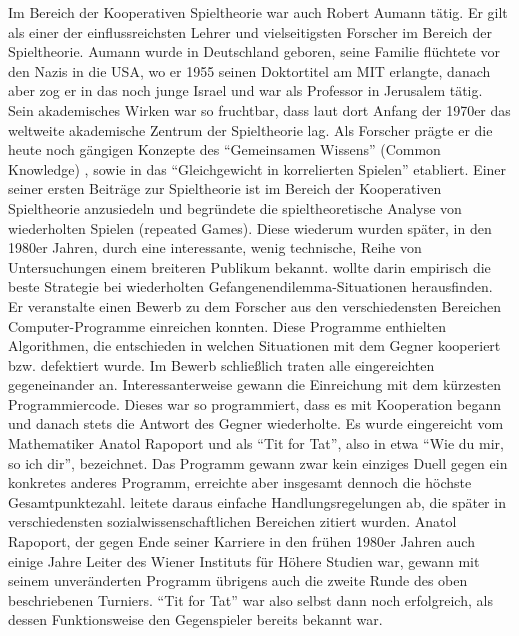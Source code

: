 Im Bereich der Kooperativen Spieltheorie war auch Robert Aumann tätig. Er gilt als einer der einflussreichsten Lehrer und vielseitigsten Forscher im Bereich der Spieltheorie. Aumann wurde in Deutschland geboren, seine Familie flüchtete vor den Nazis in die USA, wo er 1955 seinen Doktortitel am MIT erlangte, danach aber zog er in das noch junge Israel und war als Professor in Jerusalem tätig. Sein akademisches Wirken war so fruchtbar, dass laut \textcite[S. 120]{Roth2019} dort Anfang der 1970er das weltweite akademische Zentrum der Spieltheorie lag. Als Forscher prägte er die heute noch gängigen Konzepte des "`Gemeinsamen Wissens"' (Common Knowledge) \parencite{Aumann1976}, sowie in \textcite{Aumann1987} das "`Gleichgewicht in korrelierten Spielen"' etabliert. Einer seiner ersten Beiträge zur Spieltheorie \parencite{Aumann1959} ist im Bereich der Kooperativen Spieltheorie anzusiedeln und begründete die spieltheoretische Analyse von wiederholten Spielen (repeated Games). Diese wiederum wurden später, in den 1980er Jahren, durch eine interessante, wenig technische, Reihe von Untersuchungen einem breiteren Publikum bekannt. \textcite{Axelrod1981, Axelrod1984} wollte darin empirisch die beste Strategie bei wiederholten Gefangenendilemma-Situationen herausfinden. Er veranstalte einen Bewerb zu dem Forscher aus den verschiedensten Bereichen Computer-Programme einreichen konnten. Diese Programme enthielten Algorithmen, die entschieden in welchen Situationen mit dem Gegner kooperiert bzw. defektiert wurde. Im Bewerb schließlich traten alle eingereichten gegeneinander an. Interessanterweise gewann die Einreichung mit dem kürzesten Programmiercode. Dieses war so programmiert, dass es mit Kooperation begann und danach stets die Antwort des Gegner wiederholte. Es wurde eingereicht vom Mathematiker Anatol Rapoport und als "`Tit for Tat"', also in etwa "`Wie du mir, so ich dir"', bezeichnet. Das Programm gewann zwar kein einziges Duell gegen ein konkretes anderes Programm, erreichte aber insgesamt dennoch die höchste Gesamtpunktezahl. \textcite{Axelrod1984} leitete daraus einfache Handlungsregelungen ab, die später in verschiedensten sozialwissenschaftlichen Bereichen zitiert wurden. Anatol Rapoport, der gegen Ende seiner Karriere in den frühen 1980er Jahren auch einige Jahre Leiter des Wiener Instituts für Höhere Studien war, gewann mit seinem unveränderten Programm übrigens auch die zweite Runde des oben beschriebenen Turniers. "`Tit for Tat"' war also selbst dann noch erfolgreich, als dessen Funktionsweise den Gegenspieler bereits bekannt war.

